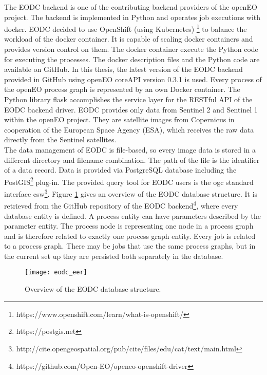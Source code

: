 \documentclass[draft,final]{vutinfth} %
\begin{document}
The EODC backend is one of the contributing backend providers of the openEO project. The backend is implemented in Python and operates job executions with docker. EODC decided to use OpenShift (using Kubernetes) \footnote{https://www.openshift.com/learn/what-is-openshift/} to balance the workload of the docker container. It is capable of scaling docker containers and provides version control on them. The docker container execute the Python code for executing the processes. The docker description files and the Python code are available on GitHub. In this thesis, the latest version of the EODC backend provided in GitHub using openEO coreAPI version 0.3.1 is used. Every process of the openEO process graph is represented by an own Docker container. The Python library flask accomplishes the service layer for the RESTful API of the EODC backend driver. EODC provides only data from Sentinel 2 and Sentinel 1 within the openEO project. They are satellite images from Copernicus in cooperation of the European Space Agency (ESA), which receives the raw data directly from the Sentinel satellites. \\
The data management of EODC is file-based, so every image data is stored in a different directory and filename combination. The path of the file is the identifier of a data record. Data is provided via PostgreSQL database including the PostGIS\footnote{https://postgis.net} plug-in. The provided query tool for EODC users is the \gls{ogc} standard interface \gls{csw}\footnote{http://cite.opengeospatial.org/pub/cite/files/edu/cat/text/main.html}. Figure \ref{fig:eodceer} gives an overview of the EODC database structure. It is retrieved from the GitHub repository of the EODC backend\footnote{https://github.com/Open-EO/openeo-openshift-driver}, where every database entity is defined. A process entity can have parameters described by the parameter entity. The process node is representing one node in a process graph and is therefore related to exactly one process graph entity. Every job is related to a process graph. There may be jobs that use the same process graphs, but in the current set up they are persisted both separately in the database.

\begin{figure}[h]
	\centering
	\texttt{[image: eodc\_eer]}
	\caption{Overview of the EODC database structure.}
	\label{fig:eodceer} %
\end{figure}
\end{document}
